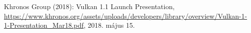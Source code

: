 
\begin{thebibliography}{9}
	Khronos Group (2018): Vulkan 1.1 Launch Presentation, \url{https://www.khronos.org/assets/uploads/developers/library/overview/Vulkan-1-1-Presentation_Mar18.pdf}, 2018. m\'ajus 15.
\end{thebibliography}